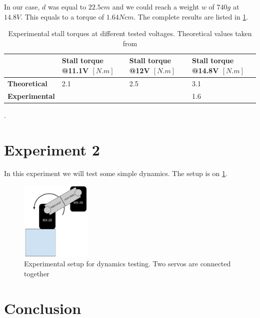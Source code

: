 In our case, $d$ was equal to $22.5cm$ and we could reach a weight $w$ of $740g$ at $14.8V$. This equals to a torque of $1.64Ncm$. The complete results are listed in \cref{table:exp1_results}.
\begin{table}[htp]
\center
\begin{tabularx}{\textwidth}{@{}l X X X @{}}
\toprule
& \textbf{Stall torque @11.1V $[N.m]$} & \textbf{Stall torque @12V $[N.m]$} & \textbf{Stall torque @14.8V $[N.m]$}\\ 
\midrule
\textbf{Theoretical} & 2.1 & 2.5 & 3.1\\ 
\textbf{Experimental} &  &  & 1.6\\ 
\bottomrule
\end{tabularx}
\caption[Results of experiment 1]{Experimental stall torques at different tested voltages. Theoretical values taken from \cite{mx_28_manual}}.
\label{table:exp1_results}
\end{table}

\section{Experiment 2}
In this experiment we will test some simple dynamics. The setup is on \cref{fig:exp2}.

\begin{figure}[htp]
\center
    \includegraphics[width = 0.3\textwidth]{figures/exp2}
    \caption[Experimental setup dynamics testing]{Experimental setup for dynamics testing. Two servos are connected together }
    \label{fig:exp2}
\end{figure}


\section{Conclusion}